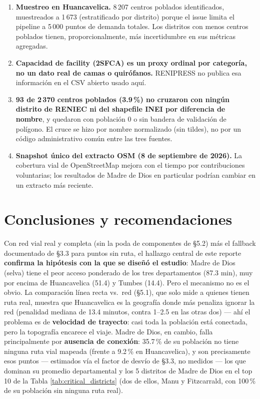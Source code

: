 \documentclass[11pt]{article}
\begin{document}
\begin{enumerate}
  está identificada pero no aplicada.
\item \textbf{Muestreo en Huancavelica.} 8\,207 centros poblados
  identificados, muestreados a 1\,673 (estratificado por distrito) porque
  el issue limita el pipeline a 5\,000 puntos de demanda totales. Los
  distritos con menos centros poblados tienen, proporcionalmente, más
  incertidumbre en sus métricas agregadas.
\item \textbf{Capacidad de facility (2SFCA) es un proxy ordinal por
  categoría, no un dato real de camas o quirófanos.} RENIPRESS no publica
  esa información en el CSV abierto usado aquí.
\item \textbf{93 de 2\,370 centros poblados (3.9\,\%) no cruzaron con
  ningún distrito de RENIEC ni del shapefile INEI por diferencia de
  nombre}, y quedaron con población 0 o sin bandera de validación de
  polígono. El cruce se hizo por nombre normalizado (sin tildes), no por un
  código administrativo común entre las tres fuentes.
\item \textbf{Snapshot único del extracto OSM (8 de septiembre de 2026).}
  La cobertura vial de OpenStreetMap mejora con el tiempo por
  contribuciones voluntarias; los resultados de Madre de Dios en particular
  podrían cambiar en un extracto más reciente.
\end{enumerate}

\section{Conclusiones y recomendaciones}

Con red vial real y completa (sin la poda de componentes de \S5.2) más el
fallback documentado de \S3.3 para puntos sin ruta, el hallazgo central de
este reporte \textbf{confirma la hipótesis con la que se diseñó el
estudio}: Madre de Dios (selva) tiene el peor acceso ponderado de los tres
departamentos (87.3 min), muy por encima de Huancavelica (51.4) y Tumbes
(14.4). Pero el mecanismo no es el obvio. La comparación línea recta
vs.\ red (\S5.1), que solo mide a quienes tienen ruta real, muestra que
Huancavelica es la geografía donde más penaliza ignorar la red (penalidad
mediana de 13.4 minutos, contra 1--2.5 en las otras dos) --- ahí el
problema es de \textbf{velocidad de trayecto}: casi toda la población está
conectada, pero la topografía encarece el viaje. Madre de Dios, en cambio,
falla principalmente por \textbf{ausencia de conexión}: 35.7\,\% de su
población no tiene ninguna ruta vial mapeada (frente a 9.2\,\% en
Huancavelica), y son precisamente esos puntos --- estimados vía el factor
de desvío de \S3.3, no medidos --- los que dominan su promedio
departamental y los 5 distritos de Madre de Dios en el top 10 de la Tabla
\ref{tab:critical_districts} (dos de ellos, Manu y Fitzcarrald, con
100\,\% de su población sin ninguna ruta real).
\end{document}
